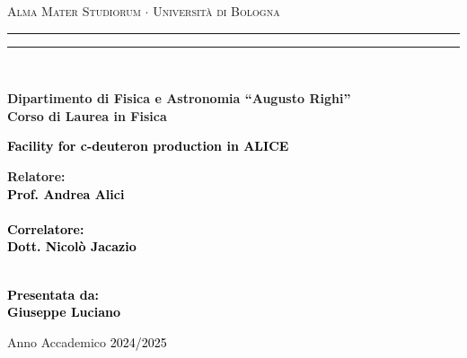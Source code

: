 \documentclass[12pt,a4paper]{book}
\begin{document}
	\begin{titlepage}
		\begin{center}
			{{\Large{\textsc{Alma Mater Studiorum $\cdot$ Universit\`a di Bologna}}}} 
			\rule[0.1cm]{15.8cm}{0.1mm}
			\rule[0.5cm]{15.8cm}{0.6mm}
			\\\vspace{3mm}
			
			{\small{\bf Dipartimento di Fisica e Astronomia “Augusto Righi”\\
					Corso di Laurea in Fisica}}
			
		\end{center}
		
		\vspace{23mm}
		
		\begin{center}\textcolor{black}{
				{\LARGE{\bf Facility for c-deuteron production in ALICE}}\\
		}\end{center}
		
		\vspace{50mm} \par \noindent
		
		\begin{minipage}[t]{0.47\textwidth}
			{\large{\bf Relatore: \vspace{2mm}\\\textcolor{black}{
						Prof. Andrea Alici}\\\\
					\textcolor{black}{
						\bf Correlatore: 
						\vspace{2mm}\\
						Dott. Nicolò Jacazio \\\\}}}
		\end{minipage}
		\hfill
		\begin{minipage}[t]{0.47\textwidth}\raggedleft \textcolor{black}{
				{\large{\bf Presentata da:
						\vspace{2mm}\\
						Giuseppe Luciano}}}
		\end{minipage}
		
		\vspace{40mm}
		
		\begin{center}
			Anno Accademico \textcolor{black}{ 2024/2025}
		\end{center}
		
	\end{titlepage}
	\newpage
	
\end{document}
